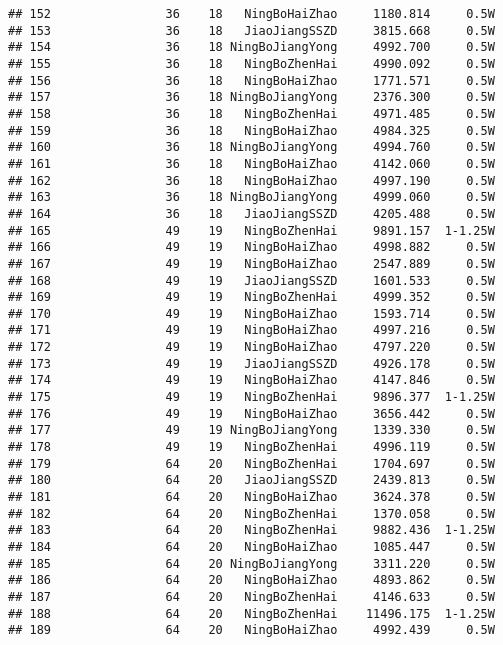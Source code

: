 \documentclass[]{article}
\begin{document}
\begin{verbatim}
## 152                36    18   NingBoHaiZhao     1180.814     0.5W
## 153                36    18   JiaoJiangSSZD     3815.668     0.5W
## 154                36    18 NingBoJiangYong     4992.700     0.5W
## 155                36    18   NingBoZhenHai     4990.092     0.5W
## 156                36    18   NingBoHaiZhao     1771.571     0.5W
## 157                36    18 NingBoJiangYong     2376.300     0.5W
## 158                36    18   NingBoZhenHai     4971.485     0.5W
## 159                36    18   NingBoHaiZhao     4984.325     0.5W
## 160                36    18 NingBoJiangYong     4994.760     0.5W
## 161                36    18   NingBoHaiZhao     4142.060     0.5W
## 162                36    18   NingBoHaiZhao     4997.190     0.5W
## 163                36    18 NingBoJiangYong     4999.060     0.5W
## 164                36    18   JiaoJiangSSZD     4205.488     0.5W
## 165                49    19   NingBoZhenHai     9891.157  1-1.25W
## 166                49    19   NingBoHaiZhao     4998.882     0.5W
## 167                49    19   NingBoHaiZhao     2547.889     0.5W
## 168                49    19   JiaoJiangSSZD     1601.533     0.5W
## 169                49    19   NingBoZhenHai     4999.352     0.5W
## 170                49    19   NingBoHaiZhao     1593.714     0.5W
## 171                49    19   NingBoHaiZhao     4997.216     0.5W
## 172                49    19   NingBoHaiZhao     4797.220     0.5W
## 173                49    19   JiaoJiangSSZD     4926.178     0.5W
## 174                49    19   NingBoHaiZhao     4147.846     0.5W
## 175                49    19   NingBoZhenHai     9896.377  1-1.25W
## 176                49    19   NingBoHaiZhao     3656.442     0.5W
## 177                49    19 NingBoJiangYong     1339.330     0.5W
## 178                49    19   NingBoZhenHai     4996.119     0.5W
## 179                64    20   NingBoZhenHai     1704.697     0.5W
## 180                64    20   JiaoJiangSSZD     2439.813     0.5W
## 181                64    20   NingBoHaiZhao     3624.378     0.5W
## 182                64    20   NingBoZhenHai     1370.058     0.5W
## 183                64    20   NingBoZhenHai     9882.436  1-1.25W
## 184                64    20   NingBoHaiZhao     1085.447     0.5W
## 185                64    20 NingBoJiangYong     3311.220     0.5W
## 186                64    20   NingBoHaiZhao     4893.862     0.5W
## 187                64    20   NingBoZhenHai     4146.633     0.5W
## 188                64    20   NingBoZhenHai    11496.175  1-1.25W
## 189                64    20   NingBoHaiZhao     4992.439     0.5W

\end{verbatim}
\end{document}

